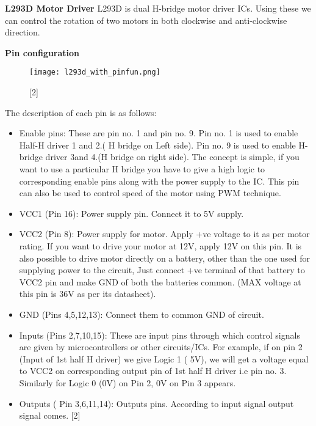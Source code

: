 \documentclass[11pt,a4paper]{article}
\begin{document}
    \newpage
    \flushleft
    \textbf{L293D Motor Driver}
    \vspace{0.3cm}
    \newline
    L293D is dual H-bridge motor driver ICs. Using these we can control the rotation of two motors in both clockwise and anti-clockwise direction.
    
    \vspace{0.3cm}
    \textbf{Pin configuration}
    \begin{figure}[h!]
    	\texttt{[image: l293d\_with\_pinfun.png]}
    	\centering
    	\caption{[2]}
    \end{figure}
    
    The description of each pin is as follows:
    \begin{itemize}
    	\item Enable pins: These are pin no. 1 and pin no. 9. Pin no. 1 is used to enable Half-H driver 1 and 2.( H bridge on Left side). Pin no. 9 is used to enable H-bridge driver 3and 4.(H bridge on right side). The concept is simple, if you want to use a particular H bridge you have to give a high logic to corresponding enable pins along with the power supply to the IC. This pin can also be used to control speed of the motor using PWM technique.
    	\item VCC1 (Pin 16): Power supply pin. Connect it to 5V supply.
    	\item VCC2 (Pin 8): Power supply for motor. Apply +ve voltage to it as per motor rating. If you want to drive your motor at 12V, apply 12V on this pin. It is also possible to drive motor directly on a battery, other than the one used for supplying power to the circuit, Just connect +ve terminal of that battery to VCC2 pin and make GND of both the batteries common. (MAX voltage at this pin is 36V as per its datasheet).
    	\item GND (Pins 4,5,12,13): Connect them to common GND of circuit.
    	\item Inputs (Pins 2,7,10,15): These are input pins through which control signals are given by microcontrollers or other circuits/ICs. For example, if on pin 2 (Input of 1st half H driver) we give Logic 1 ( 5V), we will get a voltage equal to VCC2 on corresponding output pin of 1st half H driver i.e pin no. 3. Similarly for Logic 0 (0V) on Pin 2, 0V on Pin 3 appears.
    	\item Outputs ( Pin 3,6,11,14): Outputs pins. According to input signal output signal comes. [2]
    \end{itemize}
    
\end{document}
